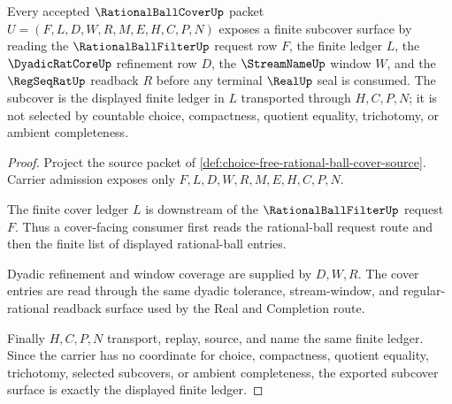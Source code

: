 \begin{theorem}
\label{thm:choice-free-rational-ball-cover-finite-subcover}
Every accepted $\RationalBallCoverUp$ packet $U=(F,L,D,W,R,M,E,H,C,P,N)$ exposes a finite subcover surface by reading the $\RationalBallFilterUp$ request row $F$, the finite ledger $L$, the $\DyadicRatCoreUp$ refinement row $D$, the $\StreamNameUp$ window $W$, and the $\RegSeqRatUp$ readback $R$ before any terminal $\RealUp$ seal is consumed. The subcover is the displayed finite ledger in $L$ transported through $H,C,P,N$; it is not selected by countable choice, compactness, quotient equality, trichotomy, or ambient completeness.
\end{theorem}
\begin{proof}
Project the source packet of \autoref{def:choice-free-rational-ball-cover-source}. Carrier admission exposes only $F,L,D,W,R,M,E,H,C,P,N$.

The finite cover ledger $L$ is downstream of the $\RationalBallFilterUp$ request $F$. Thus a cover-facing consumer first reads the rational-ball request route and then the finite list of displayed rational-ball entries.

Dyadic refinement and window coverage are supplied by $D,W,R$. The cover entries are read through the same dyadic tolerance, stream-window, and regular-rational readback surface used by the Real and Completion route.

Finally $H,C,P,N$ transport, replay, source, and name the same finite ledger. Since the carrier has no coordinate for choice, compactness, quotient equality, trichotomy, selected subcovers, or ambient completeness, the exported subcover surface is exactly the displayed finite ledger.
\end{proof}

